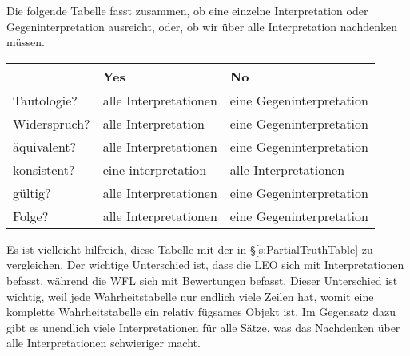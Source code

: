 Die folgende Tabelle fasst zusammen, ob eine einzelne Interpretation oder Gegeninterpretation ausreicht, oder, ob wir über alle Interpretation nachdenken müssen.

\begin{center}\small
\begin{tabular}{l l l}
 & \textbf{Yes} & \textbf{No}\\
 \hline
Tautologie? & alle Interpretationen & eine Gegeninterpretation\\
Widerspruch? &  alle Interpretation  & eine Gegeninterpretation\\
äquivalent? & alle Interpretationen & eine Gegeninterpretation\\
konsistent? & eine interpretation & alle Interpretationen\\
gültig? & alle Interpretationen & eine Gegeninterpretation\\
Folge? & alle Interpretationen & eine Gegeninterpretation\\
\end{tabular}
\end{center}
\label{table.ModelOrArgument}

Es ist vielleicht hilfreich, diese Tabelle mit der in \S\ref{s:PartialTruthTable} zu vergleichen. Der wichtige Unterschied ist, dass die LEO sich mit Interpretationen befasst, während die WFL sich mit Bewertungen befasst. Dieser Unterschied ist wichtig, weil jede Wahrheitstabelle nur endlich viele Zeilen hat, womit eine komplette Wahrheitstabelle ein relativ fügsames Objekt ist. Im Gegensatz dazu gibt es unendlich viele Interpretationen für alle Sätze, was das Nachdenken über alle Interpretationen schwieriger macht. 
